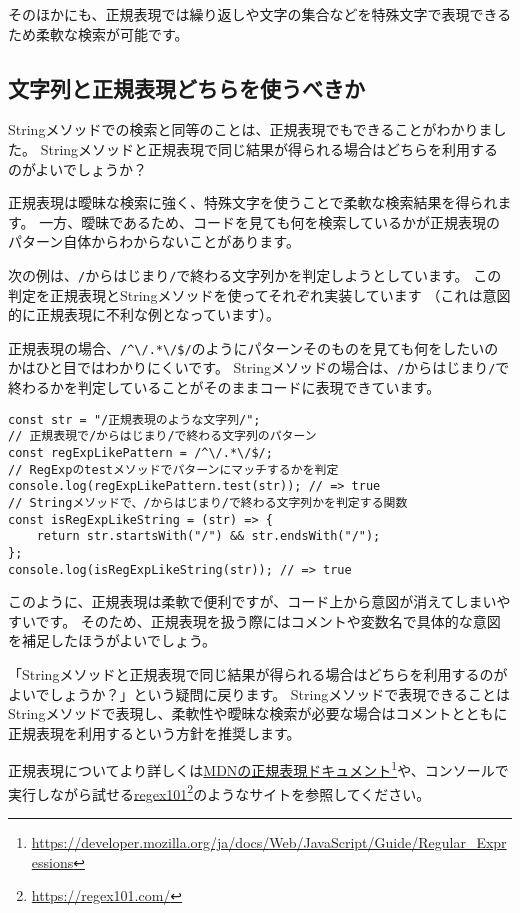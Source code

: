 そのほかにも、正規表現では繰り返しや文字の集合などを特殊文字で表現できるため柔軟な検索が可能です。

\hypertarget{string-or-regexp}{%
\subsection{文字列と正規表現どちらを使うべきか}\label{string-or-regexp}}

Stringメソッドでの検索と同等のことは、正規表現でもできることがわかりました。
Stringメソッドと正規表現で同じ結果が得られる場合はどちらを利用するのがよいでしょうか？

正規表現は曖昧な検索に強く、特殊文字を使うことで柔軟な検索結果を得られます。
一方、曖昧であるため、コードを見ても何を検索しているかが正規表現のパターン自体からわからないことがあります。

次の例は、\texttt{/}からはじまり\texttt{/}で終わる文字列かを判定しようとしています。
この判定を正規表現とStringメソッドを使ってそれぞれ実装しています
（これは意図的に正規表現に不利な例となっています）。

正規表現の場合、\texttt{/\^{}\textbackslash/.*\textbackslash/\$/}のようにパターンそのものを見ても何をしたいのかはひと目ではわかりにくいです。
Stringメソッドの場合は、\texttt{/}からはじまり\texttt{/}で終わるかを判定していることがそのままコードに表現できています。

\begin{lstlisting}
const str = "/正規表現のような文字列/";
// 正規表現で/からはじまり/で終わる文字列のパターン
const regExpLikePattern = /^\/.*\/$/;
// RegExpのtestメソッドでパターンにマッチするかを判定
console.log(regExpLikePattern.test(str)); // => true
// Stringメソッドで、/からはじまり/で終わる文字列かを判定する関数
const isRegExpLikeString = (str) => {
    return str.startsWith("/") && str.endsWith("/");
};
console.log(isRegExpLikeString(str)); // => true
\end{lstlisting}

このように、正規表現は柔軟で便利ですが、コード上から意図が消えてしまいやすいです。
そのため、正規表現を扱う際にはコメントや変数名で具体的な意図を補足したほうがよいでしょう。

「Stringメソッドと正規表現で同じ結果が得られる場合はどちらを利用するのがよいでしょうか？」という疑問に戻ります。
Stringメソッドで表現できることはStringメソッドで表現し、柔軟性や曖昧な検索が必要な場合はコメントとともに正規表現を利用するという方針を推奨します。

正規表現についてより詳しくは\href{https://developer.mozilla.org/ja/docs/Web/JavaScript/Guide/Regular_Expressions}{MDNの正規表現ドキュメント}\footnote{\url{https://developer.mozilla.org/ja/docs/Web/JavaScript/Guide/Regular_Expressions}}や、コンソールで実行しながら試せる\href{https://regex101.com/}{regex101}\footnote{\url{https://regex101.com/}}のようなサイトを参照してください。

